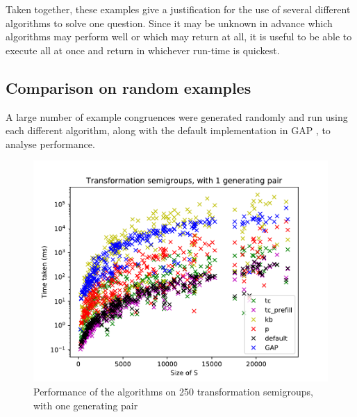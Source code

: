 Taken together, these examples give a justification for the use of several
different algorithms to solve one question.  Since it may be unknown in advance
which algorithms may perform well or which may return at all, it is useful to be
able to execute all at once and return in whichever run-time is quickest.

\subsection{Comparison on random examples}
A large number of example congruences were generated randomly and run using each
different algorithm, along with the default implementation in GAP \cite{gap}, to
analyse performance.

\begin{figure}[h]
  \centering
  \includegraphics[width=\textwidth]{pics/ch-pairs/bench-trans-1p-times}
  \caption{Performance of the algorithms on 250 transformation semigroups, with
    one generating pair}
  \label{fig:bench-trans-1p-times}
\end{figure}


